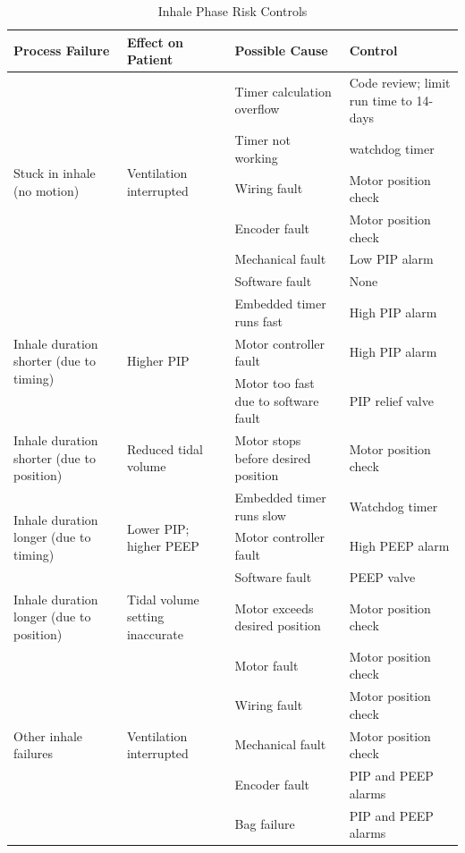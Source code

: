 \documentclass[]{article}
\begin{document}
\begin{center}
	\begin{table}[h]
		\caption{Inhale Phase Risk Controls}
		\label{tab:inhale_risk}
		\begin{tabular}{ |p{3.5cm}|p{3cm}| p{3.5cm}| p{3.5cm}|}
			
			
			\hline
			\textbf{Process Failure}& \textbf{Effect on Patient} &\textbf{Possible Cause} & \textbf{Control}  \\ \hline
			\multirow{6}{3.5cm}{Stuck in inhale (no motion)} & \multirow{6}{3cm}{Ventilation interrupted} & Timer calculation overflow & Code review; limit run time to 14-days \\ \cline{3-4}
			& & Timer not working & watchdog timer\\ \cline{3-4}
			& & Wiring fault & Motor position check\\ \cline{3-4}
			& & Encoder fault & Motor position check\\ \cline{3-4}
			& & Mechanical fault & Low PIP alarm\\ \cline{3-4}
			& & Software fault & None\\ \hline
			\multirow{3}{3.5cm}{Inhale duration shorter (due to timing)} & \multirow{3}{3cm}{Higher PIP} & Embedded timer runs fast & High PIP alarm\\ \cline{3-4}
			& & Motor controller fault & High PIP alarm\\ \cline{3-4}
			& & Motor too fast due to software fault & PIP relief valve\\ \hline
			Inhale duration shorter (due to position) & Reduced tidal volume & Motor stops before desired position & Motor position check\\ \hline
			\multirow{3}{3.5cm}{Inhale duration longer (due to timing)} & \multirow{3}{3cm}{Lower PIP; higher PEEP} & Embedded timer runs slow & Watchdog timer\\ \cline{3-4}
			& & Motor controller fault & High PEEP alarm\\ \cline{3-4}
			& & Software fault & PEEP valve\\ \hline
			Inhale duration longer (due to position) & Tidal volume setting inaccurate & Motor exceeds desired position & Motor position check\\ \hline
			\multirow{5}{3.5cm}{Other inhale failures} & \multirow{5}{3cm}{Ventilation interrupted} & Motor fault & Motor position check\\ \cline{3-4}
			& & Wiring fault & Motor position check\\ \cline{3-4}
			& & Mechanical fault & Motor position check\\ \cline{3-4}
			& & Encoder fault & PIP and PEEP alarms\\ \cline{3-4}
			& & Bag failure & PIP and PEEP alarms\\ \hline
			
		\end{tabular}
	\end{table}	
\end{center}
\end{document}
